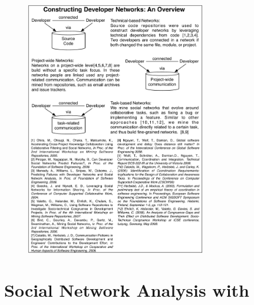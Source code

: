 \begin{figure}[t!]
\begin{center}
\includegraphics[width=0.7\textwidth]{figures/related_work.pdf}
\end{center}
\end{figure}





\section{Social Network Analysis with \jazztm}

